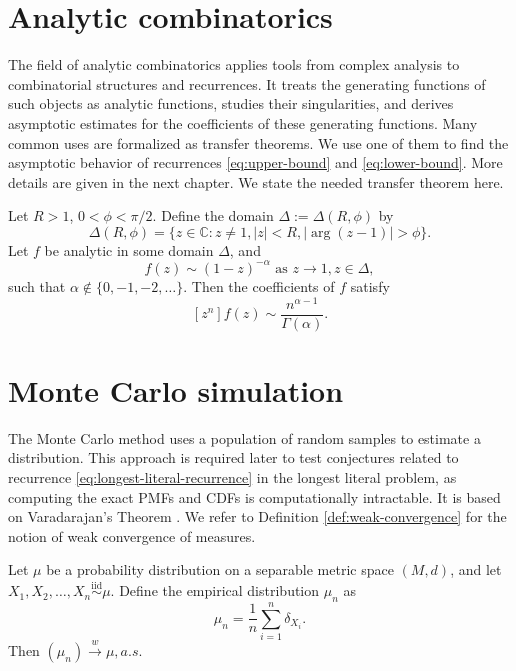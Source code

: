 \section{Analytic combinatorics}

The field of analytic combinatorics \cite{flajolet2009analytic} applies tools from complex analysis to combinatorial structures and recurrences. It treats the generating functions of such objects as analytic functions, studies their singularities, and derives asymptotic estimates for the coefficients of these generating functions. Many common uses are formalized as transfer theorems. We use one of them to find the asymptotic behavior of recurrences \eqref{eq:upper-bound} and \eqref{eq:lower-bound}. More details are given in the next chapter. We state the needed transfer theorem here.

\begin{theorem}
  \label{thm:sim-transfer}
  Let $R>1$, $0<\phi<\pi/2$. Define the domain $\Delta:=\Delta(R,\phi)$ by
  $$\Delta(R, \phi) = \{z \in \mathbb{C} : z\neq 1, |z| < R, |\arg(z-1)| > \phi\}.$$
  Let $f$ be analytic in some domain $\Delta$, and
  $$f(z)\sim (1-z)^{-\alpha} \text{ as } z\to 1, z\in \Delta,$$
  such that $\alpha \notin \{0,-1,-2, \ldots\}$. Then the coefficients of $f$ satisfy
  $$[z^n]f(z) \sim \frac{n^{\alpha-1}}{\Gamma(\alpha)}.$$
\end{theorem}

\section{Monte Carlo simulation}
\label{subsec:monte-carlo-simulation}

The Monte Carlo method uses a population of random samples to estimate a distribution. This approach is required later to test conjectures related to recurrence \eqref{eq:longest-literal-recurrence} in the longest literal problem, as computing the exact PMFs and CDFs is computationally intractable. It is based on Varadarajan's Theorem \cite{varadarajan1958weak}. We refer to Definition \ref{def:weak-convergence} for the notion of weak convergence of measures.

\begin{theorem}[Varadarajan]
  Let $\mu$ be a probability distribution on a separable metric space $(M,d)$, and let $X_1, X_2, \ldots, X_n \stackrel{\text{iid}}{\sim} \mu$. Define the empirical distribution $\mu_n$ as
  $$\mu_n = \frac{1}{n} \sum_{i=1}^n \delta_{X_i}.$$
  Then $(\mu_n)\xrightarrow{w} \mu, a.s.$
\end{theorem}

